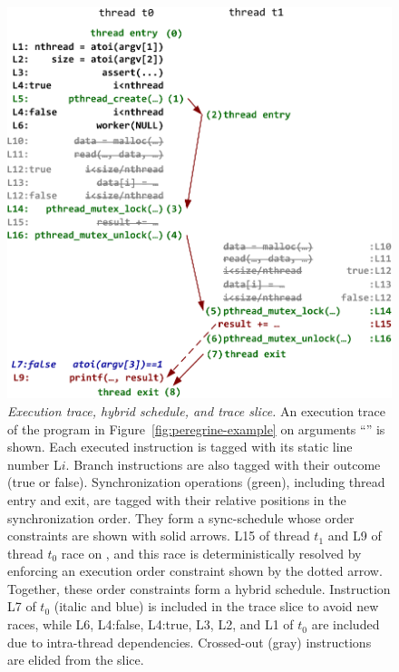 \begin{figure}[t]
\begin{minipage}[t]{\columnwidth}
\centering
\includegraphics[width=\textwidth]{peregrine/figures/trace}
\end{minipage}
\caption{{\em Execution trace, hybrid schedule, and trace slice.}  An
  execution trace of the program in Figure~\ref{fig:peregrine-example} on arguments
  ``'' is shown.  Each executed instruction is tagged
  with its static line number L$i$.  Branch instructions are also tagged
  with their outcome (true or false).  Synchronization operations (green),
  including thread entry and exit, are tagged
  with their relative positions in the synchronization order.  They form a
  sync-schedule whose order constraints are shown with solid arrows.  L15 of
  thread $t_1$ and L9 of thread $t_0$ race on , and this race is
  deterministically resolved by enforcing an execution order constraint
  shown by the dotted arrow.  Together, these order constraints form a hybrid
  schedule.  Instruction L7 of $t_0$ (italic and blue) is included in the
  trace slice to avoid new races, while L6, L4:false, L4:true, L3, L2, and
  L1 of $t_0$ are included due to intra-thread
  dependencies. Crossed-out (gray) instructions are elided from the
  slice.}\label{fig:peregrine-trace}
\end{figure}

